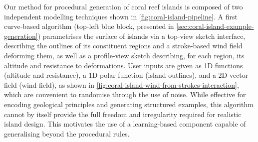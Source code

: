 






Our method for procedural generation of coral reef islands is composed of two independent modelling techniques shown in \cref{fig:coral-island-pipeline}. A first curve-based algorithm (top-left blue block, presented in \cref{sec:coral-island-example-generation}) parametrises the surface of islands via a top-view sketch interface, describing the outlines of its constituent regions and a stroke-based wind field deforming them, as well as a profile-view sketch describing, for each region, its altitude and resistance to deformations. User inputs are given as 1D functions (altitude and resistance), a 1D polar function (island outlines), and a 2D vector field (wind field), as shown in \cref{fig:coral-island-wind-from-strokes-interaction}, which are convenient to randomise through the use of noise. While effective for encoding geological principles and generating structured examples, this algorithm cannot by itself provide the full freedom and irregularity required for realistic island design. This motivates the use of a learning-based component capable of generalising beyond the procedural rules.

